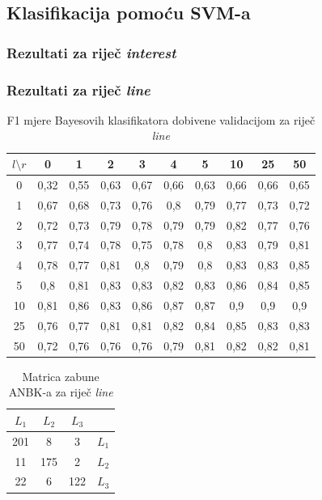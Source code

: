 \documentclass[10pt, a4paper]{article}
\begin{document}
\subsection{Klasifikacija pomoću SVM-a}
\subsubsection{Rezultati za riječ \emph{interest}} 
\subsubsection{Rezultati za riječ \emph{line}} 
\begin{table}[!hbtp]
\caption{F1 mjere Bayesovih klasifikatora dobivene validacijom za riječ \emph{line}}
\label{tab:line_validation_bayes}
\begin{center}
\begin{tabular}{|c|ccccccccc|}
\hline
$l \setminus r$ & 0 & 1 & 2 & 3 & 4 & 5 & 10 & 25 & 50 \\
\hline
0  & 0,32  & 0,55  & 0,63  & 0,67  & 0,66  & 0,63  & 0,66  & 0,66  & 0,65 \\  
1  & 0,67  & 0,68  & 0,73  & 0,76  & 0,8   & 0,79  & 0,77  & 0,73  & 0,72 \\ 
2  & 0,72  & 0,73  & 0,79  & 0,78  & 0,79  & 0,79  & 0,82  & 0,77  & 0,76 \\ 
3  &  0,77  & 0,74  & 0,78  & 0,75  & 0,78  & 0,8   & 0,83  & 0,79  & 0,81 \\ 
4  & 0,78  & 0,77  & 0,81  & 0,8   & 0,79  & 0,8   & 0,83  & 0,83  & 0,85 \\ 
5  & 0,8   & 0,81  & 0,83  & 0,83  & 0,82  & 0,83  & 0,86  & 0,84  & 0,85 \\ 
10 & 0,81  & 0,86  & 0,83  & 0,86  & 0,87  & 0,87  & 0,9   & 0,9   & 0,9  \\
25 & 0,76  & 0,77  & 0,81  & 0,81  & 0,82  & 0,84  & 0,85  & 0,83  & 0,83 \\ 
50 & 0,72  & 0,76  & 0,76  & 0,76  & 0,79  & 0,81  & 0,82  & 0,82  & 0,81 \\ 
\hline
\end{tabular}
\end{center}
\end{table}

\begin{table}[!hbtp]
\caption{Matrica zabune ANBK-a za riječ \emph{line}}
\label{tab:line_confusion_bayes}
\begin{center}
\begin{tabular}{|ccc|c|}
\hline
$L_1$ & $L_2$ & $L_3$ &  \\
\hline
  201 &  8  &  3  &   $L_1$ \\
  11  & 175 &  2  &   $L_2$ \\
  22  & 6   & 122 &   $L_3$ \\
\hline
\end{tabular}
\end{center}
\end{table}
\end{document}
